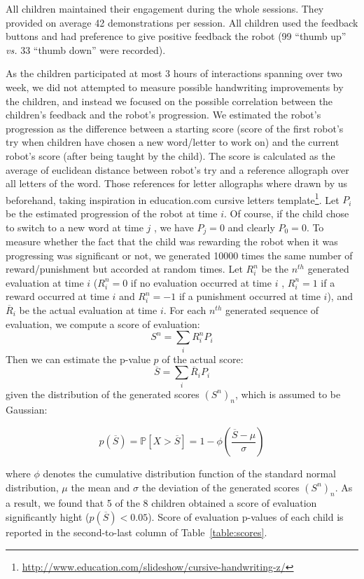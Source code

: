 \documentclass{article}
\newcommand{\vs}{\textit{vs.}\xspace}
\begin{document}
All children maintained their engagement during the whole sessions. They
provided on average 42 demonstrations per session. All children used the
feedback buttons and had preference to give positive feedback the robot (99
``thumb up'' \vs 33 ``thumb down'' were recorded). 

As the children participated at most 3 hours of interactions spanning over two
week, we did not attempted to measure possible handwriting improvements by the
children, and instead we focused on the possible correlation between the
children's feedback and the robot's progression.  We estimated the robot's
progression as the difference between a starting score (score of the first
robot's try when children have chosen a new word/letter to work on) and the
current robot's score (after being taught by the child). The score is calculated
as the average of euclidean distance between robot's try and a reference
allograph over all letters of the word. Those references for letter allographs
where drawn by us beforehand, taking inspiration in education.com cursive
letters
template\footnote{\url{http://www.education.com/slideshow/cursive-handwriting-z/}}.
Let $P_i$ be the estimated progression of the robot at time $ i$. Of course, if
the child chose to switch to a new word at time $ j$ , we have $ P_{j}=0$ and
clearly $ P_0=0$.  To measure whether the fact that the child was rewarding the
robot when it was progressing was significant or not, we generated 10000 times
the same number of reward/punishment but accorded at random times. Let $ R_i^n$
be the $n^{th}$ generated evaluation at time $ i$ ($ R_i^n = 0$ if no evaluation
occurred at time $ i$ , $ R_i^n=1$ if a reward occurred at time $i$ and
$R_i^n=-1$ if a punishment occurred at time $i$), and $\overline{R}_i$ be the
actual evaluation at time $i$. For each $n^{th}$ generated sequence of
evaluation, we compute a score of evaluation: $$ S^n = \sum\limits_i{R_i^n
P_i}$$ Then we can estimate the p-value $p$ of the actual score: $$ \overline{S}
= \sum\limits_i{\overline{R}_i P_i}$$ given the distribution of the generated
scores $\left(S^n\right)_n$, which is assumed to be Gaussian: 

$$
p(\overline{S})= \mathbb{P}{\left[X>\overline{S}\right]} = 1-\phi{\left(\frac{\overline{S}-\mu}{\sigma}\right)}
$$

where $\phi$ denotes the cumulative distribution function of the standard normal
distribution, $\mu$ the mean and $\sigma$ the deviation of the generated scores
$\left(S^n\right)_n$.  As a result, we found that 5 of the 8 children obtained a
score of evaluation significantly hight ($p(\overline{S})<0.05$). Score of
evaluation p-values of each child is reported in the second-to-last column of
Table~\ref{table:scores}.
\end{document}
